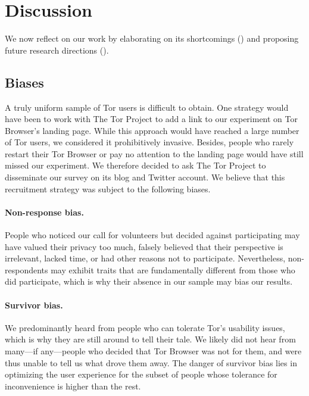 \section{Discussion}
\label{sec:discussion}

We now reflect on our work by elaborating on its shortcomings
() and proposing future research directions
().

\subsection{Biases}
\label{sec:biases}

A truly uniform sample of Tor users is difficult to obtain.  One strategy would
have been to work with The Tor Project to add a link to our experiment on Tor
Browser's landing page.  While this approach would have reached a large number
of Tor users, we considered it prohibitively invasive.  Besides, people who
rarely restart their Tor Browser or pay no attention to the landing page would
have still missed our experiment.  We therefore decided to ask The Tor Project
to disseminate our survey on its blog and Twitter account.  We believe that this
recruitment strategy was subject to the following biases.

\paragraph{Non-response bias.}
People who noticed our call for volunteers but decided against participating may
have valued their privacy too much, falsely believed that their perspective is
irrelevant, lacked time, or had other reasons not to participate.  Nevertheless,
non-respondents may exhibit traits that are fundamentally different from those
who did participate, which is why their absence in our sample may bias our
results.

\paragraph{Survivor bias.}
We predominantly heard from people who can tolerate Tor's usability issues,
which is why they are still around to tell their tale.  We likely did not hear
from many---if any---people who decided that Tor Browser was not for them, and
were thus unable to tell us what drove them away.  The danger of survivor bias
lies in optimizing the user experience for the subset of people whose tolerance
for inconvenience is higher than the rest.

